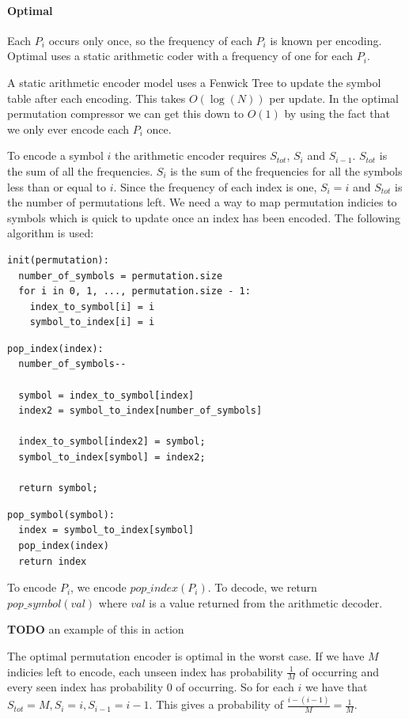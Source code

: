 \documentclass[a4paper]{report}
\newcommand{\todo}{\textbf{TODO} }
\begin{document}
\paragraph{Optimal}
Each $P_i$ occurs only once, so the frequency of each $P_i$ is known per
encoding. Optimal uses a static arithmetic coder with a frequency of one for
each $P_i$.

A static arithmetic encoder model uses a Fenwick Tree \citep{fenwick1994new}
to update the symbol table after each encoding. This takes $O(\log(N))$ per
update. In the optimal permutation compressor we can get this down to $O(1)$
by using the fact that we only ever encode each $P_i$ once.

To encode a symbol $i$ the arithmetic encoder requires $S_{tot}$, $S_i$ and
$S_{i-1}$. $S_{tot}$ is the sum of all the frequencies. $S_i$ is the sum of
the frequencies for all the symbols less than or equal to $i$. Since the
frequency of each index is one, $S_i = i$ and $S_{tot}$ is the number of
permutations left. We need a way to map permutation indicies to symbols which
is quick to update once an index has been encoded. The following algorithm is
used:

\begin{verbatim}
init(permutation):
  number_of_symbols = permutation.size
  for i in 0, 1, ..., permutation.size - 1:
    index_to_symbol[i] = i
    symbol_to_index[i] = i
\end{verbatim}

\begin{verbatim}
pop_index(index):
  number_of_symbols--

  symbol = index_to_symbol[index]
  index2 = symbol_to_index[number_of_symbols]

  index_to_symbol[index2] = symbol;
  symbol_to_index[symbol] = index2;

  return symbol;
\end{verbatim}

\begin{verbatim}
pop_symbol(symbol):
  index = symbol_to_index[symbol]
  pop_index(index)
  return index
\end{verbatim}

To encode $P_i$, we encode $pop\_index(P_i)$. To decode, we return
$pop\_symbol(val)$ where $val$ is a value returned from the arithmetic
decoder.

\todo an example of this in action

The optimal permutation encoder is optimal in the worst case. If we have $M$
indicies left to encode, each unseen index has probability $\frac{1}{M}$ of
occurring and every seen index has probability $0$ of occurring. So for each
$i$ we have that $S_{tot}=M, S_i = i, S_{i-1} = i-1$. This gives a probability
of $\frac{i-(i-1)}{M} = \frac{1}{M}$.
\end{document}
